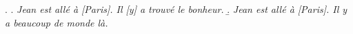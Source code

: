 \documentclass[a4paper]{article}
\begin{document}
\ex.
\a. \textsl{Jean est allé à [Paris]. Il [y] a trouvé le bonheur.}
\b. \textsl{Jean est allé à [Paris]. Il y a beaucoup de monde là.}


% 
% 
% 
% 
\end{document}
